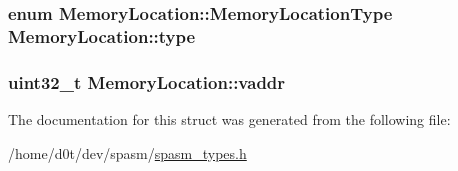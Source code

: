 \hypertarget{struct_memory_location_a2736152232b8c5033a0ec806877105db}{
\subsubsection[{type}]{\setlength{\rightskip}{0pt plus 5cm}enum {\bf \-Memory\-Location\-::\-Memory\-Location\-Type}  {\bf \-Memory\-Location\-::type}}}\label{struct_memory_location_a2736152232b8c5033a0ec806877105db}
\hypertarget{struct_memory_location_a925b7416925925d465bbbc162bb3bc4c}{
\subsubsection[{vaddr}]{\setlength{\rightskip}{0pt plus 5cm}uint32\-\_\-t {\bf \-Memory\-Location\-::vaddr}}}\label{struct_memory_location_a925b7416925925d465bbbc162bb3bc4c}


\-The documentation for this struct was generated from the following file\-:\begin{DoxyCompactItemize}
\item 
/home/d0t/dev/spasm/\hyperlink{spasm__types_8h}{spasm\-\_\-types.\-h}\end{DoxyCompactItemize}
